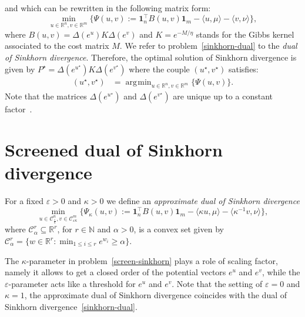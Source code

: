 \documentclass{article}
\newcommand{\inr}[1]{\langle #1 \rangle}
\newcommand{\R}{{\mathbb{R}}}
\DeclareMathOperator*{\argmin}{\arg\!\min}
\begin{document}
and which can be rewritten in the following matrix form:
\begin{equation}
\label{sinkhorn-dual}
\min_{u \in \R^n, v\in\R^m}\big\{\Psi(u,v):= \mathbf{1}_n^\top B(u,v)\mathbf{1}_m - \inr{u, \mu} - \inr{v, \nu} \big\},
\end{equation}
where $B(u,v) = \Delta(e^{u}) K \Delta(e^{v})$ and $K = e^{-M/\eta}$ stands for the Gibbs kernel associated to the cost matrix $M$. 
We refer to problem~\eqref{sinkhorn-dual} to the \emph{dual of Sinkhorn divergence}.
Therefore, the optimal solution of Sinkhorn divergence is given by $P^\star = \Delta(e^{u^\star}) K \Delta(e^{v^\star})$
where the couple $(u^\star, v^\star)$ satisfies:
\begin{align*}
\label{sinkhorn-dual}
  (u^\star, v^\star) &= \argmin_{u \in \R^{n}, v\in \R^m} \{\Psi(u,v)\}.
\end{align*}
Note that the matrices $\Delta(e^{u^\star})$ and $\Delta(e^{v^\star})$ are unique up to a constant factor~\citep{sinkhorn1967}.

\section{Screened dual of Sinkhorn divergence}

For a fixed $\varepsilon > 0$ and $\kappa > 0$ we define an \emph{approximate dual of Sinkhorn divergence} 
\begin{equation} 
\label{screen-sinkhorn}
\min_{u \in \mathcal{C}^n_{\frac \varepsilon \kappa}, v\in \mathcal{C}^m_{\varepsilon\kappa}} \big\{\Psi_{\kappa}(u,v):= \mathbf{1}_n^\top B(u,v)\mathbf{1}_m - \inr{\kappa u, \mu} - \inr{\kappa^{-1}v, \nu} \big\},
\end{equation}
where $\mathcal{C}^r_{\alpha} \subseteq \R^r$, for $r\in \mathbb N$ and $\alpha >0$, is a convex set  given by $\mathcal{C}^r_{\alpha} = \{w \in \R^{r}: \min_{1\leq i\leq r} e^{w_i} \geq \alpha\}$.

The $\kappa$-parameter in problem~\eqref{screen-sinkhorn} plays a role of scaling factor, namely it allows to get a closed order of the potential vectors $e^u$ and $e^v$, while the $\varepsilon$-parameter acts like a threshold for $e^u$ and $e^v$.
Note that the setting of $\varepsilon=0$ and $\kappa=1$, the approximate dual of Sinkhorn divergence coincides with the dual of Sinkhorn divergence~\eqref{sinkhorn-dual}.
\end{document}
